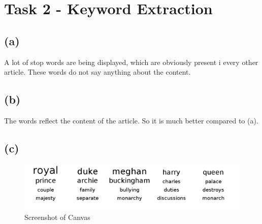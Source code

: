 \documentclass[a4paper]{article}
\begin{document}
\section*{Task 2 - Keyword Extraction}
\subsection*{(a)}
A lot of stop words are being displayed, which are obviously present i every other article. These words do not say anything about the content.
\subsection*{(b)}
The words reflect the content of the article. So it is much better compared to (a).
\subsection*{(c)}
\begin{figure}[!ht]
	\centering
	\includegraphics[width=0.7\linewidth]{ex2}
	\caption{Screenshot of Canvas}
	\label{fig:ex2}
\end{figure}
\end{document}
